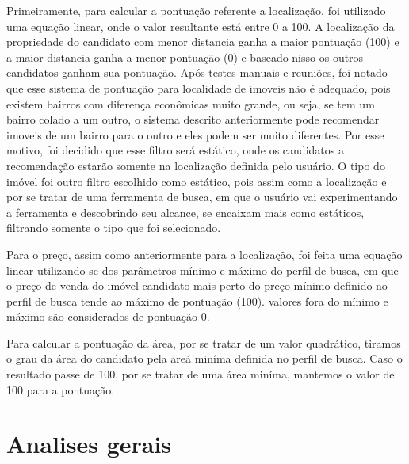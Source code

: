 Primeiramente, para calcular a pontuação referente a localização, foi utilizado uma equação linear, onde o valor resultante está entre 0 a 100. A localização da propriedade do candidato com menor distancia ganha a maior pontuação (100) e a maior distancia ganha a menor pontuação (0) e baseado nisso os outros candidatos ganham sua pontuação. Após testes manuais e reuniões, foi notado que esse sistema de pontuação para localidade de imoveis não é adequado, pois existem bairros com diferença econômicas muito grande, ou seja, se tem um bairro colado a um outro, o sistema descrito anteriormente pode recomendar imoveis de um bairro para o outro e eles podem ser muito diferentes. Por esse motivo, foi decidido que esse filtro será estático, onde os candidatos a recomendação estarão somente na localização definida pelo usuário. O tipo do imóvel foi outro filtro escolhido como estático, pois assim como a localização e por se tratar de uma ferramenta de busca, em que o usuário vai experimentando a ferramenta e descobrindo seu alcance, se encaixam mais como estáticos, filtrando somente o tipo que foi selecionado.

Para o preço, assim como anteriormente para a localização, foi feita uma equação linear utilizando-se dos parâmetros mínimo e máximo do perfil de busca, em que o preço de venda do imóvel candidato mais perto do preço mínimo definido no perfil de busca tende ao máximo de pontuação (100). valores fora do mínimo e máximo são considerados de pontuação 0.

Para calcular a pontuação da área, por se tratar de um valor quadrático, tiramos o grau da área do candidato pela areá miníma definida no perfil de busca. Caso o resultado passe de 100, por se tratar de uma área miníma, mantemos o valor de 100 para a pontuação. 

\section{Analises gerais}



